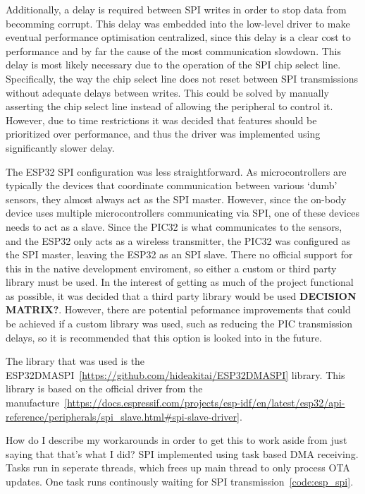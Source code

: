 Additionally, a delay is required between SPI writes in order to stop data from becomming corrupt.
This delay was embedded into the low-level driver to make eventual performance optimisation centralized,
since this delay is a clear cost to performance and by far the cause of the most communication slowdown.
This delay is most likely necessary due to the operation of the SPI chip select line.
Specifically, the way the chip select line does not reset between SPI transmissions without adequate delays between writes.
This could be solved by manually asserting the chip select line instead of allowing the peripheral to control it.
However, due to time restrictions it was decided that features should be prioritized over performance,
and thus the driver was implemented using significantly slower delay.

The ESP32 SPI configuration was less straightforward.
As microcontrollers are typically the devices that coordinate communication between various `dumb' sensors,
they almost always act as the SPI master.
However, since the on-body device uses multiple microcontrollers communicating via SPI,
one of these devices needs to act as a slave.
Since the PIC32 is what communicates to the sensors, and the ESP32 only acts as a wireless transmitter,
the PIC32 was configured as the SPI master, leaving the ESP32 as an SPI slave.
There no official support for this in the native development enviroment, so either a custom or third party library must be used.
In the interest of getting as much of the project functional as possible, it was decided that a third party library would be used \textbf{DECISION MATRIX?}.
However, there are potential peformance improvements that could be achieved if a custom library was used, such as reducing the PIC transmission delays,
so it is recommended that this option is looked into in the future.

The library that was used is the ESP32DMASPI~\ref{https://github.com/hideakitai/ESP32DMASPI} library.
This library is based on the official driver from the manufacture~\ref{https://docs.espressif.com/projects/esp-idf/en/latest/esp32/api-reference/peripherals/spi_slave.html#spi-slave-driver}.

How do I describe my workarounds in order to get this to work aside from just saying that that's what I did?
SPI implemented using task based DMA receiving.
Tasks run in seperate threads, which frees up main thread to only process OTA updates.
One task runs continously waiting for SPI transmission~\autoref{code:esp_spi}.

